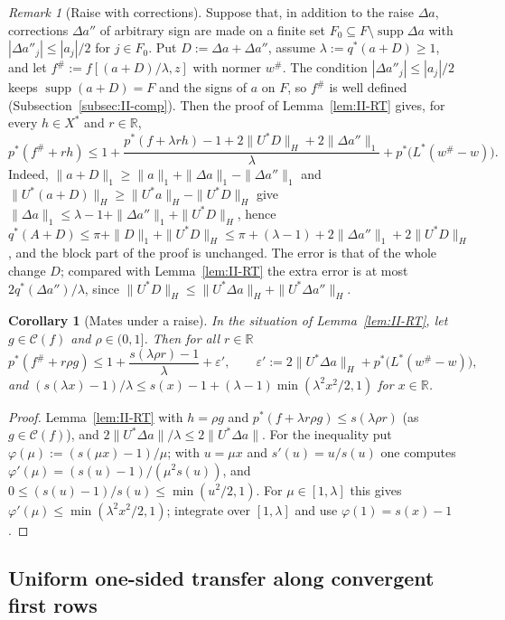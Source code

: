 \documentclass[10pt]{amsart}
\newtheorem{corollary}[theorem]{Corollary}
\theoremstyle{definition}
\theoremstyle{remark}
\newtheorem{remark}[theorem]{Remark}
\newcommand{\supp}{\operatorname{supp}}
\newcommand{\R}{\mathbb R}
\newcommand{\Cset}{\mathcal C}
\begin{document}
\begin{remark}[Raise with corrections]\label{rem:II-RTcorr}
Suppose that, in addition to the raise $\Delta a$, corrections $\Delta a''$
of arbitrary sign are made on a finite set $F_0\subseteq F\setminus
\supp\Delta a$ with $|\Delta a''_j|\le|a_j|/2$ for $j\in F_0$.  Put
$D:=\Delta a+\Delta a''$, assume $\lambda:=q^*(a+D)\ge1$, and let
$f^\#:=f[(a+D)/\lambda,z]$ with normer $w^\#$.  The condition
$|\Delta a''_j|\le|a_j|/2$ keeps $\supp(a+D)=F$ and the signs of $a$ on
$F$, so $f^\#$ is well defined (Subsection~\ref{subsec:II-comp}).  Then the
proof of Lemma~\ref{lem:II-RT} gives, for every $h\in X^*$ and $r\in\R$,
\[
 p^*(f^\#+rh)\le1+\frac{p^*(f+\lambda rh)-1+2\|U^*D\|_H+2\|\Delta a''\|_1}
 \lambda+p^*\big(L^*(w^\#-w)\big).
\]
Indeed, $\|a+D\|_1\ge\|a\|_1+\|\Delta a\|_1-\|\Delta a''\|_1$ and
$\|U^*(a+D)\|_H\ge\|U^*a\|_H-\|U^*D\|_H$ give $\|\Delta a\|_1\le\lambda-1+
\|\Delta a''\|_1+\|U^*D\|_H$, hence $q^*(A+D)\le\pi+\|D\|_1+\|U^*D\|_H\le
\pi+(\lambda-1)+2\|\Delta a''\|_1+2\|U^*D\|_H$, and the block part of the
proof is unchanged.  The error is that of the whole change $D$; compared
with Lemma~\ref{lem:II-RT} the extra error is at most $2q^*(\Delta a'')/
\lambda$, since $\|U^*D\|_H\le\|U^*\Delta a\|_H+\|U^*\Delta a''\|_H$.
\end{remark}

\begin{corollary}[Mates under a raise]\label{cor:II-RT}
In the situation of Lemma~\textup{\ref{lem:II-RT}}, let $g\in\Cset(f)$ and
$\rho\in(0,1]$.  Then for all $r\in\R$
\[
 p^*(f^\#+r\rho g)\le1+\frac{s(\lambda\rho r)-1}\lambda+\varepsilon',\qquad
 \varepsilon':=2\|U^*\Delta a\|_H+p^*\big(L^*(w^\#-w)\big),
\]
and $(s(\lambda x)-1)/\lambda\le s(x)-1+(\lambda-1)\min(\lambda^2x^2/2,1)$ for
$x\in\R$.
\end{corollary}

\begin{proof}
Lemma~\ref{lem:II-RT} with $h=\rho g$ and $p^*(f+\lambda r\rho g)\le
s(\lambda\rho r)$ (as $g\in\Cset(f)$), and $2\|U^*\Delta a\|/\lambda\le
2\|U^*\Delta a\|$.  For the inequality put $\varphi(\mu):=(s(\mu x)-1)/\mu$;
with $u=\mu x$ and $s'(u)=u/s(u)$ one computes $\varphi'(\mu)=(s(u)-1)/(\mu^2
s(u))$, and $0\le(s(u)-1)/s(u)\le\min(u^2/2,1)$.  For $\mu\in[1,\lambda]$
this gives $\varphi'(\mu)\le\min(\lambda^2x^2/2,1)$; integrate over
$[1,\lambda]$ and use $\varphi(1)=s(x)-1$.
\end{proof}

\subsection{Uniform one-sided transfer along convergent first rows}\label{subsec:II-U}
\end{document}
